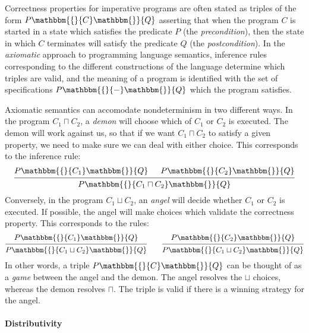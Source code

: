 \documentclass[format=sigplan,authordraft]{acmart}
\newcommand{\htr}[3]{{ {#1} \mathbbm{\{} {#2} \mathbbm{\}} {#3} }}
\begin{document}

Correctness properties for imperative programs
are often stated as triples of the form $\htr{P}{C}{Q}$
asserting that
when the program $C$ is started in a state which
satisfies the predicate $P$ (the \emph{precondition}),
then the state in which $C$ terminates
will satisfy the predicate $Q$ (the \emph{postcondition}).
In the \emph{axiomatic} approach to programming language semantics,
inference rules
corresponding to the different constructions of the language
determine which triples are valid,
and the meaning of a program is identified with
the set of specifications $\htr{P}{-}{Q}$
which the program satisfies.

Axiomatic semantics
can accomodate nondeterminism in two different ways.
In the program $C_1 \sqcap C_2$,
a \emph{demon} will choose which of $C_1$ or $C_2$ is executed.
The demon will work against us,
so that if we want $C_1 \sqcap C_2$ to satisfy a given property,
we need to make sure we can deal with either choice.
This corresponds to the inference rule:
\[
  \begin{prooftree}
    \hypo{\htr{P}{C_1}{Q}}
    \hypo{\htr{P}{C_2}{Q}}
    \infer2{\htr{P}{C_1 \sqcap C_2}{Q}}
  \end{prooftree}
\]
Conversely,
in the program $C_1 \sqcup C_2$,
an \emph{angel} will decide whether $C_1$ or $C_2$ is executed.
If possible,
the angel will make choices which validate
the correctness property.
This corresponds to the rules:
\[
  \begin{prooftree}
    \hypo{\htr{P}{C_1}{Q}}
    \infer1{\htr{P}{C_1 \sqcup C_2}{Q}}
  \end{prooftree}
  \qquad
  \begin{prooftree}
    \hypo{\htr{P}{C_2}{Q}}
    \infer1{\htr{P}{C_1 \sqcup C_2}{Q}}
  \end{prooftree}
\]
In other words,
a triple $\htr{P}{C}{Q}$
can be thought of as a \emph{game}
between the angel and the demon.
The angel resolves the $\sqcup$ choices,
whereas the demon resolves $\sqcap$.
The triple is valid if there is a winning strategy
for the angel.


\paragraph{Distributivity} %
\end{document}
